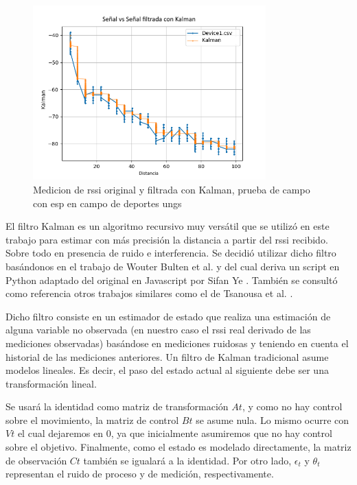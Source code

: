 \begin{figure}[!htb]
	\centering
	\includegraphics[width=0.8\textwidth]{Figuras/profiling/device1/Device1Kalman.png}
	\captionsetup{margin=2cm}
	\caption[Medicion de \acs{rssi} original y filtrada con Kalman, prueba de campo con \acs{esp} en campo de deportes \acs{ungs}]{Medicion de \acs{rssi} original y filtrada con Kalman, prueba de campo con \acs{esp} en campo de deportes \acs{ungs}}
	\label{fig:filtrado-kalman}
\end{figure}

El filtro Kalman es un algoritmo recursivo muy versátil que se utilizó en este trabajo  para estimar con más precisión la distancia a partir del \acs{rssi} recibido. Sobre todo en presencia de ruido e interferencia. Se decidió utilizar dicho filtro basándonos en el trabajo de Wouter Bulten et al. \cite{7471364} y del cual deriva un script en Python adaptado del original en Javascript por Sifan Ye \cite{SifanYe}. También se consultó como referencia otros trabajos similares como el de Tsanousa et al. \cite{tsanousa2021localization}.

Dicho filtro consiste en un estimador de estado que realiza una estimación de alguna variable no observada (en nuestro caso el \acs{rssi} real derivado de las mediciones observadas) basándose en mediciones ruidosas y teniendo en cuenta el historial de las mediciones anteriores. Un filtro de Kalman tradicional asume modelos lineales. Es decir, el paso del estado actual al siguiente debe ser una transformación lineal.

Se usará la identidad como matriz de transformación \(At\), y como no hay control sobre el movimiento, la matriz de control \(Bt\) se asume nula. Lo mismo ocurre con \(Vt\) el cual dejaremos en 0, ya que inicialmente asumiremos que no hay control sobre el objetivo. Finalmente, como el estado es modelado directamente, la matriz de observación \(Ct\) también se igualará a la identidad. Por otro lado, \(\epsilon_{t}\) y \(\theta_{t}\) representan el ruido de proceso y de medición, respectivamente.

